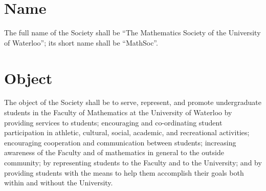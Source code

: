 \section{Name}
The full name of the Society shall be ``The Mathematics Society of the University
of Waterloo''; its short name shall be ``MathSoc''.

\section{Object}
The object of the Society shall be to serve, represent, and promote
undergraduate students in the Faculty of Mathematics at the University of
Waterloo by providing services to students; encouraging and co-ordinating
student participation in athletic, cultural, social, academic, and recreational
activities; encouraging cooperation and communication between students;
increasing awareness of the Faculty and of mathematics in general to the outside
community; by representing students to the Faculty and to the University; and by
providing students with the means to help them accomplish their goals both
within and without the University.

